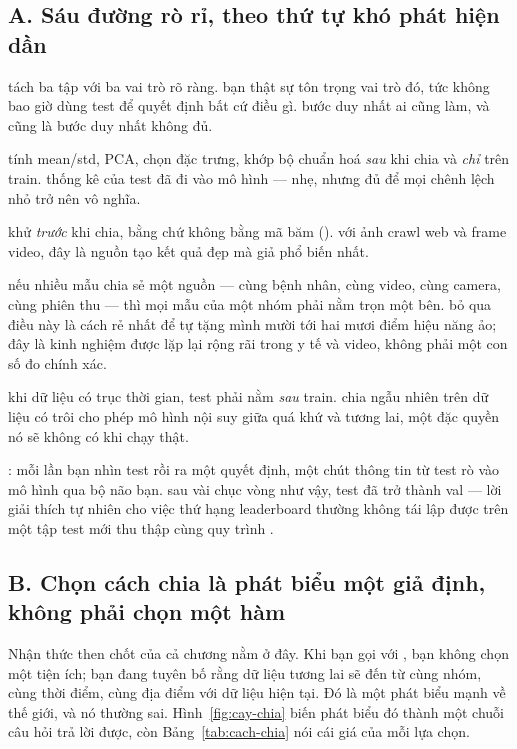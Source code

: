 \documentclass[../../deep_learning.tex]{subfiles}
\begin{document}
\subsection{A. Sáu đường rò rỉ, theo thứ tự khó phát hiện dần}
\begin{mach}
\item {} \gp tách ba tập với ba vai trò rõ ràng. \gd bạn thật sự tôn trọng vai trò đó, tức không bao giờ dùng test để quyết định bất cứ điều gì. \hq bước duy nhất ai cũng làm, và cũng là bước duy nhất không đủ.
\item {} \gp tính mean/std, PCA, chọn đặc trưng, khớp bộ chuẩn hoá \emph{sau} khi chia và \emph{chỉ} trên train. \hq thống kê của test đã đi vào mô hình --- nhẹ, nhưng đủ để mọi chênh lệch nhỏ trở nên vô nghĩa.
\item {} \gp khử  \emph{trước} khi chia, bằng  chứ không bằng mã băm (). \hq với ảnh crawl web và frame video, đây là nguồn tạo kết quả đẹp mà giả phổ biến nhất.
\item {} \gp nếu nhiều mẫu chia sẻ một nguồn --- cùng bệnh nhân, cùng video, cùng camera, cùng phiên thu --- thì mọi mẫu của một nhóm phải nằm trọn một bên. \hq bỏ qua điều này là cách rẻ nhất để tự tặng mình mười tới hai mươi điểm hiệu năng ảo; đây là kinh nghiệm được lặp lại rộng rãi trong y tế và video, không phải một con số đo chính xác.
\item {} \gp khi dữ liệu có trục thời gian, test phải nằm \emph{sau} train. \hq chia ngẫu nhiên trên dữ liệu có trôi cho phép mô hình nội suy giữa quá khứ và tương lai, một đặc quyền nó sẽ không có khi chạy thật.
\item {} \vdm {}: mỗi lần bạn nhìn test rồi ra một quyết định, một chút thông tin từ test rò vào mô hình qua bộ não bạn. \hq sau vài chục vòng như vậy, test đã trở thành val --- lời giải thích tự nhiên cho việc thứ hạng leaderboard thường không tái lập được trên một tập test mới thu thập cùng quy trình \cite{recht2019imagenet}.
\end{mach}

\subsection{B. Chọn cách chia là phát biểu một giả định, không phải chọn một hàm}
Nhận thức then chốt của cả chương nằm ở đây. Khi bạn gọi  với , bạn không chọn một tiện ích; bạn đang tuyên bố rằng dữ liệu tương lai sẽ đến từ cùng nhóm, cùng thời điểm, cùng địa điểm với dữ liệu hiện tại. Đó là một phát biểu mạnh về thế giới, và nó thường sai. Hình~\ref{fig:cay-chia} biến phát biểu đó thành một chuỗi câu hỏi trả lời được, còn Bảng~\ref{tab:cach-chia} nói cái giá của mỗi lựa chọn.
\end{document}
